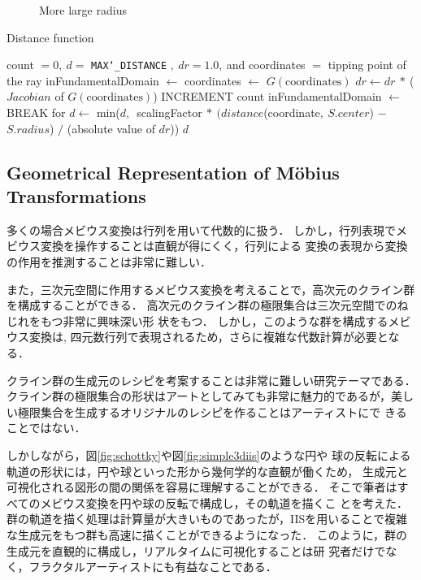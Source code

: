 \begin{figure}[htbp]
\begin{minipage}{0.5\hsize}
\begin{minipage}{0.24\hsize}
  \end{minipage}
 \hspace*{\fill}
  \caption{More large radius}
  \label{fig:limitObj}
 \end{minipage}
\end{figure}

\begin{algorithm}
 \caption{Distance function}
 \label{alg:iis3d}
 \begin{algorithmic}
  \REQUIRE count $= 0,~d = $ \texttt{MAX\char`_DISTANCE} $,~dr = 1.0,~$and coordinates $=$ tipping
  point of the ray
  \STATE inFundamentalDomain $\leftarrow$ \TRUE
  \STATE coordinates $\leftarrow$ $G(\text{coordinates})$
  \STATE $dr \leftarrow dr~*~$($Jacobian$ of $G(\text{coordinates})$)
  \STATE INCREMENT count
  \STATE inFundamentalDomain $\leftarrow$ \FALSE
  \ENDIF
  \ENDFOR
  \STATE BREAK for
  \ENDIF
  \ENDFOR
  \STATE $d \leftarrow$ min($d,$~scalingFactor$~*~(distance$(coordinate$,~S.center$) $-$
  $S.radius$) $/$ (absolute value of $dr$))
  \ENDFOR
  \RETURN $d$
 \end{algorithmic}
\end{algorithm}

\subsection{Geometrical Representation of M\"obius Transformations}

多くの場合メビウス変換は行列を用いて代数的に扱う．
しかし，行列表現でメビウス変換を操作することは直観が得にくく，行列による
変換の表現から変換の作用を推測することは非常に難しい．

また，三次元空間に作用するメビウス変換を考えることで，高次元のクライン群
を構成することができる．
高次元のクライン群の極限集合は三次元空間でのねじれをもつ非常に興味深い形
状をもつ．
しかし，このような群を構成するメビウス変換は,
四元数行列で表現されるため，さらに複雑な代数計算が必要となる．

クライン群の生成元のレシピを考案することは非常に難しい研究テーマである．
クライン群の極限集合の形状はアートとしてみても非常に魅力的であるが，美し
い極限集合を生成するオリジナルのレシピを作ることはアーティストにで
きることではない．

しかしながら，図\ref{fig:schottky}や図\ref{fig:simple3diis}のような円や
球の反転による軌道の形状には，円や球といった形から幾何学的な直観が働くため，
生成元と可視化される図形の間の関係を容易に理解することができる．
そこで筆者はすべてのメビウス変換を円や球の反転で構成し，その軌道を描くこ
とを考えた．
群の軌道を描く処理は計算量が大きいものであったが，IISを用いることで複雑
な生成元をもつ群も高速に描くことができるようになった．
このように，群の生成元を直観的に構成し，リアルタイムに可視化することは研
究者だけでなく，フラクタルアーティストにも有益なことである．

